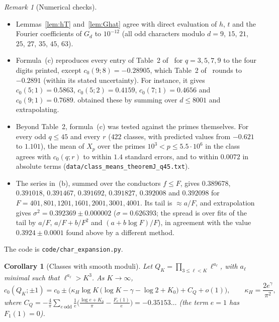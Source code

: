 \documentclass[11pt]{amsart}
\newtheorem{corollary}[lemma]{Corollary}
\theoremstyle{remark}
\newtheorem{remark}[lemma]{Remark}
\begin{document}
\begin{remark}[Numerical checks]\label{rem:Jnum}
\begin{itemize}
\item Lemmas~\ref{lem:hT} and~\ref{lem:Ghat} agree with direct evaluation of $h$, $t$ and the Fourier coefficients of $G_d$ to $10^{-12}$ (all odd characters modulo $d=9$, $15$, $21$, $25$, $27$, $35$, $45$, $63$).
\item Formula~(c) reproduces every entry of Table~2 of~\cite{TS} for $q=3,5,7,9$ to the four digits printed, except $c_0(9;8)=-0.28905$, which Table~2 of~\cite{TS} rounds to $-0.2891$ (within its stated uncertainty). For instance, it gives $c_0(5;1)=0.5863$, $c_0(5;2)=0.4159$, $c_0(7;1)=0.4656$ and $c_0(9;1)=0.7689$. \cite{TS} obtained these by summing over $d\le8001$ and extrapolating.
\item Beyond Table~2, formula~(c) was tested against the primes themselves. For every odd $q\le45$ and every $r$ ($422$ classes, with predicted values from $-0.621$ to $1.101$), the mean of $X_p$ over the primes $10^3<p\le5.5\cdot10^6$ in the class agrees with $c_0(q;r)$ to within $1.4$ standard errors, and to within $0.0072$ in absolute terms (\texttt{data/class\_means\_theoremJ\_q45.txt}).
\item The series in~(b), summed over the conductors $f\le F$, gives $0.389678$, $0.391018$, $0.391467$, $0.391692$, $0.391827$, $0.392008$ and $0.392098$ for $F=401,801,1201,1601,2001,3001,4001$. Its tail is $\approx a/F$, and extrapolation gives $\sigma^2=0.392369\pm0.000002$ ($\sigma=0.626393$; the spread is over fits of the tail by $a/F$, $a/F+b/F^2$ and $(a+b\log F)/F$), in agreement with the value $0.3924\pm0.0001$ found above by a different method.
\end{itemize}
The code is \texttt{code/char\_expansion.py}.
\end{remark}


\begin{corollary}[Classes with smooth moduli]\label{cor:smoothclass}
Let $Q_K=\prod_{3\le\ell<K}\ell^{a_\ell}$, with $a_\ell$ minimal such that $\ell^{a_\ell}>K^3$. As $K\to\infty$,
\[
c_0(Q_K;\pm1)=c_0\pm\Big(\kappa_H\log K\,\big(\log K-\gamma-\log2+K_0\big)+C_Q+o(1)\Big),\qquad\kappa_H=\frac{2e^\gamma}{\pi^2},
\]
where $C_Q=-\frac4\pi\sum_{e\ \mathrm{odd}}\frac1e\Big(\frac{\log e+K_0}\pi-\frac{F_e(1)}e\Big)=-0.35153\ldots$ (the term $e=1$ has $F_1(1)=0$).
\end{corollary}
\end{document}
